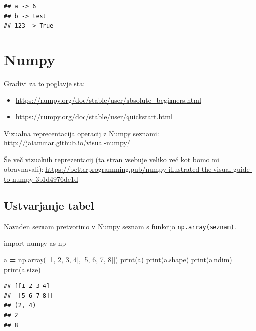 \documentclass[
]{report}
\newenvironment{Shaded}{\begin{snugshade}}{\end{snugshade}}
\newcommand{\BuiltInTok}[1]{#1}
\newcommand{\DecValTok}[1]{\textcolor[rgb]{0.00,0.00,0.81}{#1}}
\newcommand{\ImportTok}[1]{#1}
\newcommand{\NormalTok}[1]{#1}
\newcommand{\OperatorTok}[1]{\textcolor[rgb]{0.81,0.36,0.00}{\textbf{#1}}}
\providecommand{\tightlist}{%
  \setlength{\itemsep}{0pt}\setlength{\parskip}{0pt}}
\begin{document}
\begin{verbatim}
## a -> 6
## b -> test
## 123 -> True
\end{verbatim}

\hypertarget{numpy}{%
\chapter{Numpy}\label{numpy}}

Gradivi za to poglavje sta:

\begin{itemize}
\tightlist
\item
  \url{https://numpy.org/doc/stable/user/absolute_beginners.html}
\item
  \url{https://numpy.org/doc/stable/user/quickstart.html}
\end{itemize}

Vizualna reprecentacija operacij z Numpy seznami: \url{http://jalammar.github.io/visual-numpy/}

Še več vizualnih reprezentacij (ta stran vsebuje veliko več kot bomo mi obravnavali): \url{https://betterprogramming.pub/numpy-illustrated-the-visual-guide-to-numpy-3b1d4976de1d}

\hypertarget{ustvarjanje-tabel}{%
\section{Ustvarjanje tabel}\label{ustvarjanje-tabel}}

Navaden seznam pretvorimo v Numpy seznam s funkcijo \texttt{np.array(seznam)}.

\begin{Shaded}
\begin{Highlighting}[]
\ImportTok{import}\NormalTok{ numpy }\ImportTok{as}\NormalTok{ np}

\NormalTok{a }\OperatorTok{=}\NormalTok{ np.array([[}\DecValTok{1}\NormalTok{, }\DecValTok{2}\NormalTok{, }\DecValTok{3}\NormalTok{, }\DecValTok{4}\NormalTok{], [}\DecValTok{5}\NormalTok{, }\DecValTok{6}\NormalTok{, }\DecValTok{7}\NormalTok{, }\DecValTok{8}\NormalTok{]])}
\BuiltInTok{print}\NormalTok{(a)}
\BuiltInTok{print}\NormalTok{(a.shape)}
\BuiltInTok{print}\NormalTok{(a.ndim)}
\BuiltInTok{print}\NormalTok{(a.size)}
\end{Highlighting}
\end{Shaded}

\begin{verbatim}
## [[1 2 3 4]
##  [5 6 7 8]]
## (2, 4)
## 2
## 8
\end{verbatim}
\end{document}
